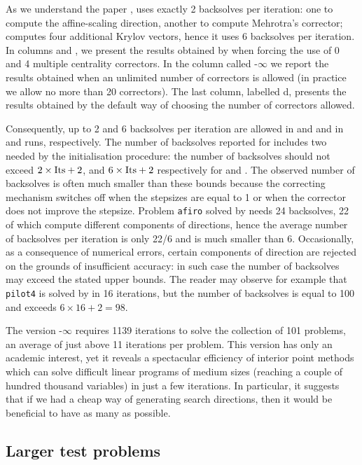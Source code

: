 As we understand the paper \cite{MehrotraLi},  uses exactly 
2 backsolves per iteration: one to compute the affine-scaling direction,
another to compute Mehrotra's corrector;  computes
four additional Krylov vectors, hence it uses
6 backsolves per iteration.
In columns  and , we present 
the results obtained by \HOPDM when forcing the use of 0 and 4 
multiple centrality correctors. 
In the column called \HO-$\infty$ we report the results 
obtained when an unlimited number of correctors is allowed
(in practice we allow no more than 20 correctors).
The last column, labelled d\HO, presents the results obtained 
by the default way of choosing the number of correctors allowed.

Consequently, up to 2 and 6 backsolves per iteration are allowed
in  and  and in  and  runs, respectively.
The number of backsolves reported for \HOPDM includes two needed by 
the initialisation procedure: the number of backsolves 
should not exceed $2 \times {\rm {Its}} + 2$, 
and $6 \times {\rm {Its}} + 2$ respectively
for  and .
The observed number of backsolves is often much smaller
than these bounds because the correcting mechanism switches off 
when the stepsizes are equal to 1 or when the corrector does not 
improve the stepsize. Problem {\tt afiro} solved by  needs 24 
backsolves, 22 of which compute different components of directions, 
hence the average number of backsolves per iteration is only 22/6 
and is much smaller than 6. Occasionally,
as a consequence of numerical errors, certain components 
of direction are rejected on the grounds of insufficient accuracy:
in such case the number of backsolves may exceed the stated upper bounds.
The reader may observe for example that {\tt pilot4} is solved by 
in 16 iterations, but the number of backsolves is equal to 100 and 
exceeds $6 \times 16 + 2 = 98$.

The version \HO-$\infty$ requires 1139 iterations to solve 
the collection of 101 problems, an average of just above 11 iterations
per problem. This version has only an academic interest, 
yet it reveals a spectacular efficiency of interior point 
methods which can solve difficult linear programs of medium sizes 
(reaching a couple of hundred thousand variables) in just 
a few iterations.
In particular, it suggests that if we had a cheap way of generating
search directions, then it would be beneficial to have as many as possible.

%
%
\subsection{Larger test problems}
\label{BN-tests}

